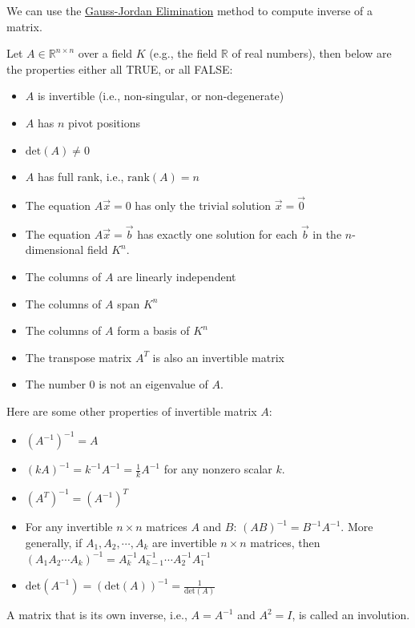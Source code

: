 \documentclass[conference,final,11pt,technote,onecolumn]{IEEEtran}\usepackage[]{graphicx}\usepackage[]{color}
\begin{document}
We can use the \hyperref[term:gauss_jordan_elimination_algorithm]{Gauss-Jordan Elimination} method to compute inverse of a matrix. 

Let $A \in \mathbb{R}^{n\times n}$ over a field $K$ (e.g., the field $\mathbb{R}$ of real numbers), then below are the properties either all TRUE, or all FALSE\cite{wiki:InvertibleMatrix}:
\begin{itemize}
\item $A$ is invertible (i.e., non-singular, or non-degenerate)
\item $A$ has $n$ pivot positions
\item $\text{det}(A) \neq 0$
\item $A$ has full rank, i.e., $\text{rank}(A) = n$
\item The equation $A\vec x=0$ has only the trivial solution $\vec x=\vec 0$
\item The equation $A\vec x=\vec b$ has exactly one solution for each $\vec b$ in the $n$-dimensional field $K^n$.
\item The columns of $A$ are linearly independent
\item The columns of $A$ span $K^n$
\item The columns of $A$ form a basis of $K^n$
\item The transpose matrix $A^T$ is also an invertible matrix
\item The number 0 is not an eigenvalue of $A$.
\end{itemize}

Here are some other properties of invertible matrix $A$:
\begin{itemize}
\item $(A^{-1})^{-1} = A$
\item $(kA)^{-1} = k^{-1}A^{-1} = \frac{1}{k}A^{-1}$ for any nonzero scalar $k$.
\item $(A^T)^{-1} = (A^{-1})^T$
\item For any invertible $n\times n$ matrices $A$ and $B$: $(AB)^{-1} = B^{-1}A^{-1}$. More generally, if $A_1,A_2,\cdots ,A_k$ are invertible $n\times n$ matrices, then $(A_1A_2\cdots A_k)^{-1} = A^{-1}_kA^{-1}_{k-1}\cdots A^{-1}_2A^{-1}_1$
\item $\text{det}(A^{-1}) = (\text{det}(A))^{-1} = \frac{1}{\text{det}(A)}$
\end{itemize}

A matrix that is its own inverse, i.e., $A = A^{-1}$ and $A^2 = I$, is called an involution.
\end{document}
